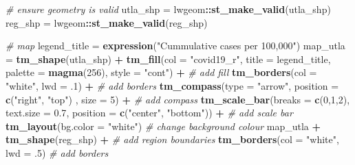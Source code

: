 \documentclass[]{book}
\newenvironment{Shaded}{\begin{snugshade}}{\end{snugshade}}
\newcommand{\KeywordTok}[1]{\textcolor[rgb]{0.13,0.29,0.53}{\textbf{#1}}}
\newcommand{\DataTypeTok}[1]{\textcolor[rgb]{0.13,0.29,0.53}{#1}}
\newcommand{\DecValTok}[1]{\textcolor[rgb]{0.00,0.00,0.81}{#1}}
\newcommand{\FloatTok}[1]{\textcolor[rgb]{0.00,0.00,0.81}{#1}}
\newcommand{\StringTok}[1]{\textcolor[rgb]{0.31,0.60,0.02}{#1}}
\newcommand{\CommentTok}[1]{\textcolor[rgb]{0.56,0.35,0.01}{\textit{#1}}}
\newcommand{\OperatorTok}[1]{\textcolor[rgb]{0.81,0.36,0.00}{\textbf{#1}}}
\newcommand{\NormalTok}[1]{#1}
\begin{document}
\begin{Shaded}
\begin{Highlighting}[]
\CommentTok{# ensure geometry is valid}
\NormalTok{utla_shp =}\StringTok{ }\NormalTok{lwgeom}\OperatorTok{::}\KeywordTok{st_make_valid}\NormalTok{(utla_shp)}
\NormalTok{reg_shp =}\StringTok{ }\NormalTok{lwgeom}\OperatorTok{::}\KeywordTok{st_make_valid}\NormalTok{(reg_shp)}

\CommentTok{# map}
\NormalTok{legend_title =}\StringTok{ }\KeywordTok{expression}\NormalTok{(}\StringTok{"Cummulative cases per 100,000"}\NormalTok{)}
\NormalTok{map_utla =}\StringTok{ }\KeywordTok{tm_shape}\NormalTok{(utla_shp) }\OperatorTok{+}
\StringTok{  }\KeywordTok{tm_fill}\NormalTok{(}\DataTypeTok{col =} \StringTok{"covid19_r"}\NormalTok{, }\DataTypeTok{title =}\NormalTok{ legend_title, }\DataTypeTok{palette =} \KeywordTok{magma}\NormalTok{(}\DecValTok{256}\NormalTok{), }\DataTypeTok{style =} \StringTok{"cont"}\NormalTok{) }\OperatorTok{+}\StringTok{ }\CommentTok{# add fill}
\StringTok{  }\KeywordTok{tm_borders}\NormalTok{(}\DataTypeTok{col =} \StringTok{"white"}\NormalTok{, }\DataTypeTok{lwd =}\NormalTok{ .}\DecValTok{1}\NormalTok{)  }\OperatorTok{+}\StringTok{ }\CommentTok{# add borders}
\StringTok{  }\KeywordTok{tm_compass}\NormalTok{(}\DataTypeTok{type =} \StringTok{"arrow"}\NormalTok{, }\DataTypeTok{position =} \KeywordTok{c}\NormalTok{(}\StringTok{"right"}\NormalTok{, }\StringTok{"top"}\NormalTok{) , }\DataTypeTok{size =} \DecValTok{5}\NormalTok{) }\OperatorTok{+}\StringTok{ }\CommentTok{# add compass}
\StringTok{  }\KeywordTok{tm_scale_bar}\NormalTok{(}\DataTypeTok{breaks =} \KeywordTok{c}\NormalTok{(}\DecValTok{0}\NormalTok{,}\DecValTok{1}\NormalTok{,}\DecValTok{2}\NormalTok{), }\DataTypeTok{text.size =} \FloatTok{0.7}\NormalTok{, }\DataTypeTok{position =}  \KeywordTok{c}\NormalTok{(}\StringTok{"center"}\NormalTok{, }\StringTok{"bottom"}\NormalTok{)) }\OperatorTok{+}\StringTok{ }\CommentTok{# add scale bar}
\StringTok{  }\KeywordTok{tm_layout}\NormalTok{(}\DataTypeTok{bg.color =} \StringTok{"white"}\NormalTok{) }\CommentTok{# change background colour}
\NormalTok{map_utla }\OperatorTok{+}\StringTok{ }\KeywordTok{tm_shape}\NormalTok{(reg_shp) }\OperatorTok{+}\StringTok{ }\CommentTok{# add region boundaries}
\StringTok{  }\KeywordTok{tm_borders}\NormalTok{(}\DataTypeTok{col =} \StringTok{"white"}\NormalTok{, }\DataTypeTok{lwd =}\NormalTok{ .}\DecValTok{5}\NormalTok{) }\CommentTok{# add borders}
\end{Highlighting}
\end{Shaded}
\end{document}
